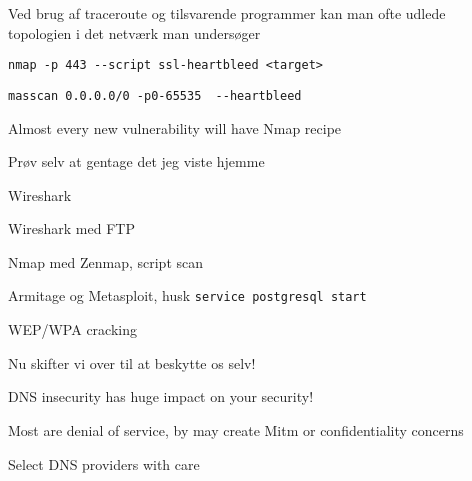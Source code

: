 \documentclass[20pt,landscape,a4paper,footrule]{foils}
\begin{document}
\begin{list1}
\item Ved brug af traceroute og tilsvarende programmer kan man ofte
  udlede topologien i det netværk man undersøger
\end{list1}






\begin{list1}
\item \verb+nmap -p 443 --script ssl-heartbleed <target>+\\
\item \verb+masscan 0.0.0.0/0 -p0-65535  --heartbleed+\\
\end{list1}

\centerline{Almost every new vulnerability will have Nmap recipe}



Prøv selv at gentage det jeg viste hjemme
\begin{list2}
\item Wireshark
\item Wireshark med FTP
\item Nmap med Zenmap, script scan
\item Armitage og Metasploit, husk \verb+service postgresql start+
\item WEP/WPA cracking
\end{list2}


Nu skifter vi over til at beskytte os selv!


\begin{list1}
\item DNS insecurity has huge impact on your security!
\item Most are denial of service, by may create Mitm or confidentiality concerns
\item Select DNS providers with care
\end{list1}
\end{document}
